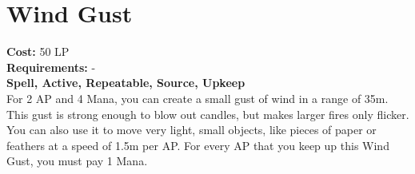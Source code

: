 \section{Wind Gust}\label{spell:windGust}
\textbf{Cost:} 50 LP\\
\textbf{Requirements:} -\\
\textbf{Spell, Active, Repeatable, Source, Upkeep}\\
For 2 AP and 4 Mana, you can create a small gust of wind in a range of 35m.
This gust is strong enough to blow out candles, but makes larger fires only flicker.
You can also use it to move very light, small objects, like pieces of paper or feathers at a speed of 1.5m per AP.
For every AP that you keep up this Wind Gust, you must pay 1 Mana.